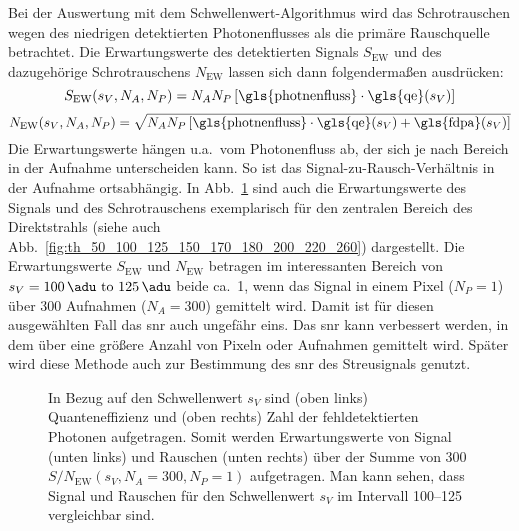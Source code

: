 \noindent
Bei der Auswertung mit dem Schwellenwert-Algorithmus wird das Schrotrauschen wegen des niedrigen detektierten Photonenflusses als die primäre Rauschquelle betrachtet. Die Erwartungswerte des detektierten Signals $S_{\text{EW}}$ und des dazugehörige Schrotrauschens $N_{\text{EW}}$ lassen sich dann folgendermaßen ausdrücken:
\begin{equation}
        S_{\text{EW}}(s_V, N_A, N_P) = N_{A}N_{P}\left[\text{\gls{photnenfluss}}\cdot\text{\gls{qe}}(s_V)\right]
        \label{eq:signal_ew}
\end{equation}
\begin{equation}
        N_{\text{EW}}(s_V, N_A, N_P) = \sqrt{N_{A}N_{P}\left[\text{\gls{photnenfluss}}\cdot\text{\gls{qe}}(s_V) + \text{\gls{fdpa}}(s_V)\right]}
        \label{eq:noise_ew}
\end{equation}
Die Erwartungswerte hängen u.a.\ vom Photonenfluss ab, der sich je nach Bereich in der Aufnahme unterscheiden kann. So ist das Signal-zu-Rausch-Verhältnis in der Aufnahme ortsabhängig. In Abb.~\ref{fig:qe_fehldetektiert_signal_noise} sind auch die Erwartungswerte des Signals und des Schrotrauschens exemplarisch für den zentralen Bereich des Direktstrahls (siehe auch Abb.~\ref{fig:th_50_100_125_150_170_180_200_220_260}) dargestellt.
Die Erwartungswerte $S_{\text{EW}}$ und $N_{\text{EW}}$ betragen im interessanten Bereich von $s_V = \text{\SIrange{100}{125}{\adu}}$ beide ca.\ \SI{1}{\photon}, wenn das Signal in einem Pixel ($N_P = 1$) über 300 Aufnahmen ($N_A = 300$) gemittelt wird. Damit ist für diesen ausgewählten Fall das \gls{snr} auch ungefähr eins. Das \gls{snr} kann verbessert werden, in dem über eine größere Anzahl von Pixeln oder Aufnahmen gemittelt wird. Später wird diese Methode auch zur Bestimmung des \gls{snr} des Streusignals genutzt.

\begin{figure}[H]
    \centering
    
    \caption{In Bezug auf den Schwellenwert $s_V$ sind (oben links) Quanteneffizienz und (oben rechts) Zahl der fehldetektierten Photonen aufgetragen. Somit werden Erwartungswerte von Signal (unten links) und Rauschen (unten rechts) über der Summe von \SI{300}{\captures} $S/N_{\text{EW}}(s_V, N_A = 300, N_P = 1)$ aufgetragen. Man kann sehen, dass Signal und Rauschen für den Schwellenwert $s_V$ im Intervall \qtyrange{100}{125}{\adu} vergleichbar sind.}
    \label{fig:qe_fehldetektiert_signal_noise}
\end{figure}


